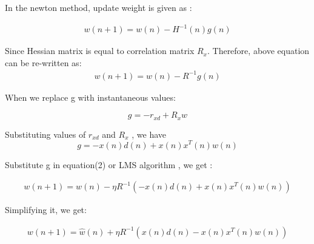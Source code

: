 \documentclass[12pt]{article}
\begin{document}
In the newton method, update weight is given as : 

\begin{align}
 w(n+1) = w(n) - H^{-1}(n)g(n)
\end{align}


Since Hessian matrix is equal to correlation matrix $R_x$. Therefore, above equation can be re-written as: 
\begin{align}
w(n+1) = w(n) - R^{-1}g(n)
\end{align}

When we replace g with instantaneous values: 

$$ g = -r_{xd} + R_{x}w $$ 

Substituting values of $r_{xd} $ and $R_{x}$ , we have $$ g  = - x(n)d(n) + x(n)x^{T} (n)w(n) $$

Substitute g in equation(2) or LMS algorithm , we get : 

\begin{align}
w(n+1 ) = \hat{w}(n) − \eta R^{-1} (- x(n)d(n) + x(n)x^{T} (n)w(n))
\end{align}

Simplifying it, we get:

\begin{align}
w(n+1 ) = \hat{w}(n) + \eta R^{-1} ( x(n)d(n) - x(n)x^{T} (n)w(n))
\end{align}
\end{document}
